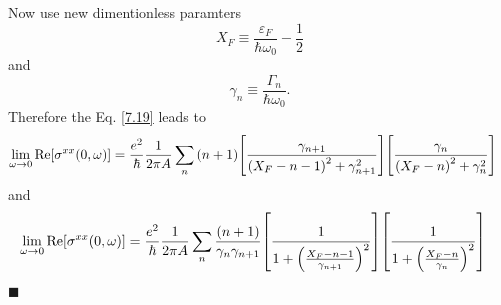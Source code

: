\noindent
Now use new dimentionless paramters
\begin{equation} \label{7.20}
  X_F \equiv \frac{\varepsilon_F}{\hbar \omega_0} -\frac{1}{2}
\end{equation}
and
\begin{equation} \label{7.21}
  \gamma_n \equiv \frac{\Gamma_n}{\hbar \omega_0}.
\end{equation}
Therefore the Eq. \eqref{7.19} leads to
\begin{equation} \label{7.22}
  \begin{aligned}
    \lim_{\omega \to 0}
    \text{Re}[{\sigma}^{xx}(0,\omega)] & =
    \frac{e^2}{\hbar}
    \frac{1}{2\pi A}
    \sum_{n}
    \qty(n+1)
    \qty[
    \frac{\gamma_{n+1}
    }
    {
    \qty(
    X_F - n - 1
    )^2
    + \gamma^2_{n+1}
    }]
    \qty[
    \frac{\gamma_{n}
    }
    {
    \qty(
    X_F - n
    )^2
    + \gamma^2_{n}
    }]
  \end{aligned}
\end{equation}
and
\begin{equation} \label{7.23}
  \begin{aligned}
    \lim_{\omega \to 0}
    \text{Re}[{\sigma}^{xx}(0,\omega)] & =
    \frac{e^2}{\hbar}
    \frac{1}{2\pi A}
    \sum_{n}
    \frac{\qty(n+1)}{\gamma_{n}\gamma_{n+1}}
    \qty[
      \frac{1}
      {
        1 + \qty(\frac{X_F - n -1}{\gamma_{n+1}})^2
      }
    ]
    \qty[
      \frac{1}
      {
        1 + \qty(\frac{X_F - n}{\gamma_{n}})^2
      }
    ]
  \end{aligned}
\end{equation}


















\hfill$\blacksquare$
